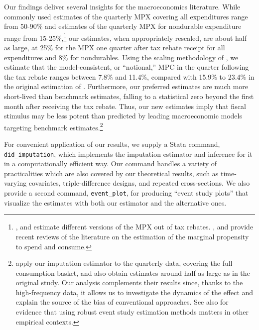\documentclass[english,11pt]{article}
\theoremstyle{plain}
\theoremstyle{plain}
\theoremstyle{plain}
\theoremstyle{plain}
\begin{document}
Our findings deliver several insights for the macroeconomics literature.
While commonly used estimates of the quarterly MPX covering all expenditures
range from 50-90\% and estimates of the quarterly MPX for nondurable
expenditure range from 15-25\%,\footnote{\textcite{Broda2014}, \textcite{Parker2013} and \textcite{Johnson2006a}
estimate different versions of the MPX out of tax rebates. \textcite{Laibson2022},
\textcite{kaplan2020marginal} and \textcite{di2020stock} provide
recent reviews of the literature on the estimation of the marginal
propensity to spend and consume.} our estimates, when appropriately rescaled, are about half as large,
at 25\% for the MPX one quarter after tax rebate receipt
for all expenditures and 8\% for nondurables. Using
the scaling methodology of \textcite{Laibson2022}, we estimate that
the model-consistent, or ``notional,'' MPC in the quarter following
the tax rebate ranges between 7.8\% and 11.4\%, compared with 15.9\%
to 23.4\% in the original estimation of \textcite{Broda2014}. Furthermore,
our preferred estimates are much more short-lived than benchmark estimates,
falling to a statistical zero beyond the first month after receiving
the tax rebate. Thus, our new estimates imply that fiscal stimulus
may be less potent than predicted by leading macroeconomic models
targeting benchmark estimates.\footnote{\textcite{Orchard2022} apply our imputation estimator to the \textcite{Parker2013}
quarterly data, covering the full consumption basket, and also obtain
estimates around half as large as in the original study. Our analysis
complements their results since, thanks to the high-frequency data,
it allows us to investigate the dynamics of the effect and explain
the source of the bias of conventional approaches. See also \textcite{Baker2021}
for evidence that using robust event study estimation methods matters
in other empirical contexts.}

For convenient application of our results, we supply a Stata command,
\texttt{did\_imputation}, which implements the imputation estimator
and inference for it in a computationally efficient way. Our command
handles a variety of practicalities which are also covered by our
theoretical results, such as time-varying covariates, triple-difference
designs, and repeated cross-sections. We also provide a second command,
\texttt{event\_plot}, for producing ``event study plots'' that visualize
the estimates with both our estimator and the alternative ones.
\end{document}
